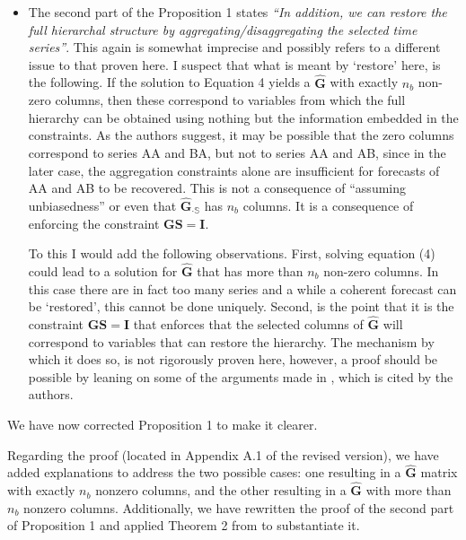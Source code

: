 \documentclass[11pt,a4paper,]{article}
\renewenvironment{quote}
               {\list{}{\rightmargin\leftmargin}%
                \item\relax\color[RGB]{0,150,0}}
               {\endlist}
\begin{document}
\begin{itemize}
\item
  The second part of the Proposition 1 states \emph{``In addition, we
  can restore the full hierarchal structure by
  aggregating/disaggregating the selected time series''}. This again is
  somewhat imprecise and possibly refers to a different issue to that
  proven here. I suspect that what is meant by `restore' here, is the
  following. If the solution to Equation 4 yields a \(\hat{\bm{G}}\)
  with exactly \(n_b\) non-zero columns, then these correspond to
  variables from which the full hierarchy can be obtained using nothing
  but the information embedded in the constraints. As the authors
  suggest, it may be possible that the zero columns correspond to series
  AA and BA, but not to series AA and AB, since in the later case, the
  aggregation constraints alone are insufficient for forecasts of AA and
  AB to be recovered. This is not a consequence of ``assuming
  unbiasedness'' or even that \(\hat{\bm{G}}_{\cdot \mathbb{S}}\) has
  \(n_b\) columns. It is a consequence of enforcing the constraint
  \(\bm{GS}=\bm{I}\).

  To this I would add the following observations. First, solving
  equation (4) could lead to a solution for \(\hat{\bm{G}}\) that has
  more than \(n_b\) non-zero columns. In this case there are in fact too
  many series and a while a coherent forecast can be `restored', this
  cannot be done uniquely. Second, is the point that it is the
  constraint \(\bm{GS}=\bm{I}\) that enforces that the selected columns
  of \(\hat{\bm{G}}\) will correspond to variables that can restore the
  hierarchy. The mechanism by which it does so, is not rigorously proven
  here, however, a proof should be possible by leaning on some of the
  arguments made in \textcite{Zhang2023-op}, which is cited by the
  authors.
\end{itemize}

\begin{quote}
We have now corrected Proposition 1 to make it clearer.

Regarding the proof (located in Appendix A.1 of the revised version), we
have added explanations to address the two possible cases: one resulting
in a \(\hat{\bm{G}}\) matrix with exactly \(n_b\) nonzero columns, and
the other resulting in a \(\hat{\bm{G}}\) with more than \(n_b\) nonzero
columns. Additionally, we have rewritten the proof of the second part of
Proposition 1 and applied Theorem 2 from \textcite{Zhang2023-op} to
substantiate it.
\end{quote}
\end{document}
